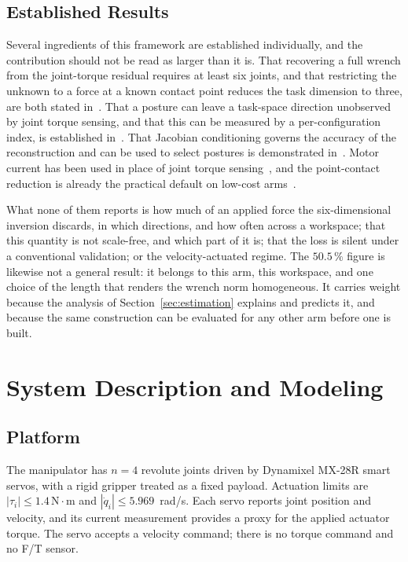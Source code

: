 \documentclass{ieeeaccess}
\begin{document}
\subsection{Established Results}
Several ingredients of this framework are established individually, and the
contribution should not be read as larger than it is. That recovering a full
wrench from the joint-torque residual requires at least six joints, and that
restricting the unknown to a force at a known contact point reduces the task
dimension to three, are both stated in~\cite{magrini2014virtual}. That a posture
can leave a task-space direction unobserved by joint torque sensing, and that this
can be measured by a per-configuration index, is established
in~\cite{wong2024sensorobs}. That Jacobian conditioning governs the accuracy of
the reconstruction and can be used to select postures is demonstrated
in~\cite{lu2023configopt}. Motor current has been used in place of joint torque
sensing~\cite{wahrburg2018motorcurrent}, and the point-contact reduction is
already the practical default on low-cost arms~\cite{yen2019virtual}.

What none of them reports is how much of an applied force the six-dimensional
inversion discards, in which directions, and how often across a workspace; that
this quantity is not scale-free, and which part of it is; that the loss is silent
under a conventional validation; or the velocity-actuated regime. The $50.5\,\%$
figure is likewise not a general result: it belongs to this arm, this workspace,
and one choice of the length that renders the wrench norm homogeneous. It carries
weight because the analysis of Section~\ref{sec:estimation} explains and predicts
it, and because the same construction can be evaluated for any other arm before
one is built.

\section{System Description and Modeling}
\label{sec:system}

\subsection{Platform}
The manipulator has $n=4$ revolute joints driven by Dynamixel MX-28R smart servos,
with a rigid gripper treated as a fixed payload. Actuation limits are
$|\tau_i|\le1.4\,\mathrm{N}\cdot\mathrm{m}$ and
$|\dot q_i|\le5.969$~rad/s. Each servo reports joint position and velocity, and
its current measurement provides a proxy for the applied actuator torque. The
servo accepts a velocity command; there is no torque command and no F/T sensor.
\end{document}
